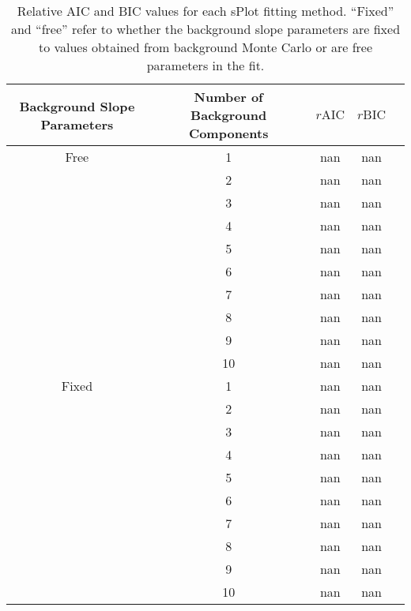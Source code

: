 \begin{table}[ht]
    \begin{center}
        \begin{tabular}{ccccc}\toprule
        Background Slope Parameters & Number of Background Components & $r\text{AIC}$ & $r\text{BIC}$\\\midrule
        Free & 1 & nan & nan \\
         & 2 & nan & nan \\
         & 3 & nan & nan \\
         & 4 & nan & nan \\
         & 5 & nan & nan \\
         & 6 & nan & nan \\
         & 7 & nan & nan \\
         & 8 & nan & nan \\
         & 9 & nan & nan \\
         & 10 & nan & nan \\
        Fixed & 1 & nan & nan \\
         & 2 & nan & nan \\
         & 3 & nan & nan \\
         & 4 & nan & nan \\
         & 5 & nan & nan \\
         & 6 & nan & nan \\
         & 7 & nan & nan \\
         & 8 & nan & nan \\
         & 9 & nan & nan \\
         & 10 & nan & nan \\\bottomrule
        \end{tabular}
        \caption{Relative AIC and BIC values for each sPlot fitting method. ``Fixed'' and ``free'' refer to whether the background slope parameters are fixed to values obtained from background Monte Carlo or are free parameters in the fit.}\label{tab:splot-model-results}
    \end{center}
\end{table}